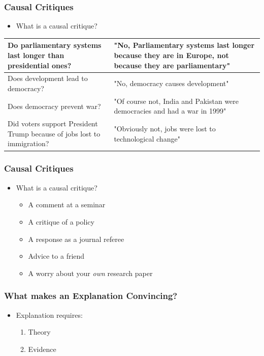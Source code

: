 \documentclass[xcolor=x11names,compress]{beamer}\usepackage[]{graphicx}\usepackage[]{color}
\renewcommand{\(}{\begin{columns}}
\renewcommand{\)}{\end{columns}}
\newcommand{\<}[1]{\begin{column}{#1}}
\renewcommand{\>}{\end{column}}
\begin{document}
\begin{frame}
\frametitle{Causal Critiques}
\begin{itemize}
\item What is a causal critique?
\pause
\end{itemize}
\begin{table}[htbp]
  \centering
    \begin{tabular}{|>{\raggedright}p{5cm}|p{5cm}|}
    \hline
    Do parliamentary systems last longer than presidential ones? & "No, Parliamentary systems last longer because they are in Europe, not because they are parliamentary" \pause \\
    \hline
    Does development lead to democracy? & "No, democracy causes development" \pause \\
    \hline
    Does democracy prevent war? & "Of course not, India and Pakistan were democracies and had a war in 1999" \pause \\
    \hline
    Did voters support President Trump because of jobs lost to immigration? & "Obviously not, jobs were lost to technological change" \\
    \hline
    \end{tabular}%
  \label{tab:addlabel}%
\end{table}%
\end{frame}

\begin{frame}
\frametitle{Causal Critiques}
\begin{itemize}
\item What is a causal critique?
\begin{itemize}
\item A comment at a seminar
\pause
\item A critique of a policy
\pause
\item A response as a journal referee
\pause
\item Advice to a friend
\pause
\item A worry about your \textit{own} research paper
\end{itemize}
\end{itemize}
\end{frame}

\begin{frame}
\frametitle{What makes an Explanation Convincing?}
\begin{itemize}
\item  Explanation requires:
\begin{enumerate}
\item  Theory
\item  Evidence
\end{enumerate}
\end{itemize}
\end{frame}
\end{document}
